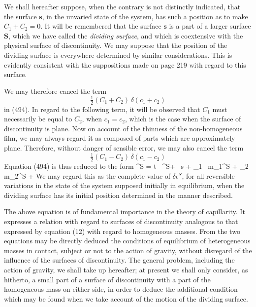 \documentclass[12pt]{article}
\newcommand{\dd}{\delta}
\begin{document}
{We shall hereafter suppose, when the contrary is not distinctly indicated, that the surface $\mathbf{s}$, in the unvaried state of the system, has such a position as to make $C_1+C_2=0$. It will be remembered that the surface $\mathbf{s}$ is a part of a larger surface $\mathbf{S}$, which we have called the \textit{dividing surface}, and which is coextensive with the physical surface of discontinuity. We may suppose that the position of the dividing surface is everywhere determined by similar considerations. This is evidently consistent with the suppositions made on page 219 with regard to this surface.

We may therefore cancel the term
$$ \tfrac{1}{2}(C_1+ C_2) \,\delta(c_1 + c_2)$$
in (494). In regard to the following term, it will be observed that $C_1$ must necessarily be equal to $C_2$, when $c_1=c_2$, which is the case when the surface of discontinuity is plane. Now on account of the thinness of the non-homogeneous film, we may always regard it as composed of parts which are approximately plane. Therefore, without danger of sensible error, we may also cancel the term
$$ \tfrac{1}{2}(C_1- C_2) \,\delta(c_1 - c_2)$$
Equation (494) is thus reduced to the form
\eqs \dd \epsilon^S = t \, \dd \eta^S+ \sigma \, \dd s + \mu_1 \, \dd m_1^S + \mu_2 \, \dd m_2^S +   \label{497} \eqe
We may regard this as the complete value of $\dd \epsilon^S$, for all reversible variations in the state of the system supposed initially in equilibrium, when the dividing surface has its initial position determined in the manner described.


The above equation is of fundamental importance in the theory of capillarity.  It expresses a relation with regard to surfaces of discontinuity analogous to that expressed by equation (12) with regard to homogeneous masses. From the two equations may be directly deduced the conditions of equilibrium  of heterogeneous masses in contact, subject or not to the action of gravity, without disregard of the influence of the surfaces of discontinuity. The general problem, including the action of gravity, we shall take up hereafter; at present we shall only consider, as hitherto, a small part of a surface of discontinuity with a part of the homogeneous mass on either side, in order to deduce the additional condition which may be found when we take account of the motion of the dividing surface.


}
\end{document}
